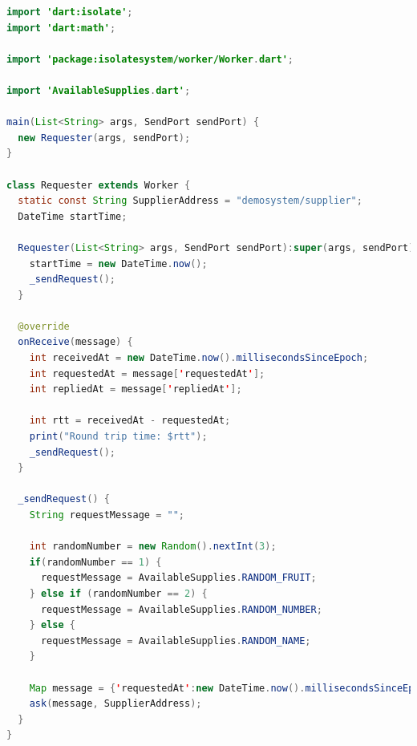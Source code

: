 \begin{lstlisting}[language=java, firstnumber=1, caption=Requester Worker of Requester-Supplier application, label=lst:requester]
import 'dart:isolate';
import 'dart:math';

import 'package:isolatesystem/worker/Worker.dart';

import 'AvailableSupplies.dart';

main(List<String> args, SendPort sendPort) {
  new Requester(args, sendPort);
}

class Requester extends Worker {
  static const String SupplierAddress = "demosystem/supplier";
  DateTime startTime;

  Requester(List<String> args, SendPort sendPort):super(args, sendPort) {
    startTime = new DateTime.now();
    _sendRequest();
  }

  @override
  onReceive(message) {
    int receivedAt = new DateTime.now().millisecondsSinceEpoch;
    int requestedAt = message['requestedAt'];
    int repliedAt = message['repliedAt'];

    int rtt = receivedAt - requestedAt;
    print("Round trip time: $rtt");
    _sendRequest();
  }

  _sendRequest() {
    String requestMessage = "";

    int randomNumber = new Random().nextInt(3);
    if(randomNumber == 1) {
      requestMessage = AvailableSupplies.RANDOM_FRUIT;
    } else if (randomNumber == 2) {
      requestMessage = AvailableSupplies.RANDOM_NUMBER;
    } else {
      requestMessage = AvailableSupplies.RANDOM_NAME;
    }

    Map message = {'requestedAt':new DateTime.now().millisecondsSinceEpoch, 'requestMessage':requestMessage};
    ask(message, SupplierAddress);
  }
}

\end{lstlisting}

